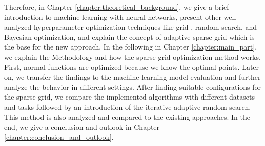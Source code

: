 Therefore, in Chapter \ref{chapter:theoretical_background}, we give a brief introduction to machine learning with neural networks, present other well-analyzed hyperparameter optimization techniques like grid-, random search, and Bayesian optimization, and explain the concept of adaptive sparse grid which is the base for the new approach. In the following in Chapter \ref{chapter:main_part}, we explain the Methodology and how the sparse grid optimization method works. First, normal functions are optimized because we know the optimal points. Later on, we transfer the findings to the machine learning model evaluation and further analyze the behavior in different settings. After finding suitable configurations for the sparse grid, we compare the implemented algorithms with different datasets and tasks followed by an introduction of the iterative adaptive random search. This method is also analyzed and compared to the existing approaches. In the end, we give a conclusion and outlook in Chapter \ref{chapter:conclusion_and_outlook}.


